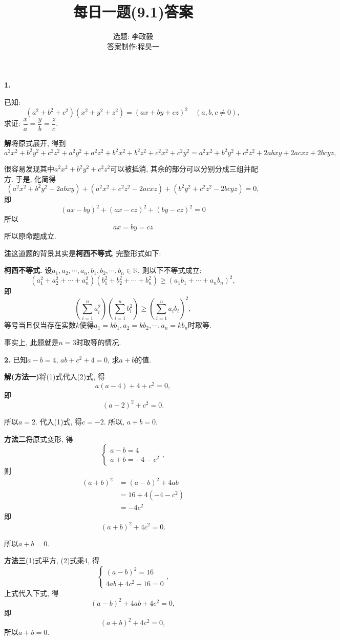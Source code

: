 \documentclass{article}
\title{每日一题(9.1)答案}
\author{\kaishu 选题: 李政毅\\\kaishu 答案制作:程昊一}
\begin{document}
\maketitle
\textbf{1. }
{\kaishu 已知:
\[\left(a^2+b^2+c^2\right)\left(x^2+y^2+z^2\right)=(ax+by+cz)^2\quad(a,b,c\neq0),\]
求证: $\dfrac{x}{a}=\dfrac{y}{b}=\dfrac{z}{c}$.\\\par}

\textbf{解}\quad 将原式展开, 得到
\[a^2x^2+b^2y^2+c^2z^2+a^2y^2+a^2z^2+b^2x^2+b^2z^2+c^2x^2+c^2y^2=a^2x^2+b^2y^2+c^2z^2+2abxy+2acxz+2bcyz,\]\par
很容易发现其中$a^2x^2+b^2y^2+c^2z^2$可以被抵消, 其余的部分可以分别分成三组并配方. 于是, 化简得
\[\left(a^2x^2+b^2y^2-2abxy\right)+\left(a^2x^2+c^2z^2-2acxz\right)+\left(b^2y^2+c^2z^2-2bcyz\right)=0,\]
即
\[(ax-by)^2+(ax-cz)^2+(by-cz)^2=0\]
所以
\[ax=by=cz\]
所以原命题成立.\\\par
\textbf{注}\quad 这道题的背景其实是\textbf{柯西不等式}, 完整形式如下:\par
\textbf{柯西不等式.} 设$a_1, a_2, \cdots, a_n, b_1, b_2, \cdots, b_n\in\mathbb{R}$, 则以下不等式成立: 
\[\left(a_1^2+a_2^2+\cdots+a_n^2\right)\left(b_1^2+b_2^2+\cdots+b_n^2\right)\ge(a_1b_1+\cdots+a_nb_n)^2,\]
即
\[\left(\sum\limits_{i=1}^na_i^2\right)\left(\sum\limits_{i=1}^nb_i^2\right)\ge\left(\sum\limits_{i=1}^na_ib_i\right)^2, \]
等号当且仅当存在实数$k$使得$a_1=kb_1, a_2=kb_2,\cdots, a_n=kb_n$时取等.\par
事实上, 此题就是$n=3$时取等的情况.\\\par
\textbf{2. }
{\kaishu 已知$a-b=4$, $ab+c^2+4=0$, 求$a+b$的值.}\\\par
\textbf{解(方法一)}\quad 将(1)式代入(2)式, 得
\[a(a-4)+4+c^2=0,\]
即
\[(a-2)^2+c^2=0.\]\par
所以$a=2$. 代入(1)式, 得$c=-2$. 所以, $a+b=0$.\par
\textbf{方法二}\quad 将原式变形, 得
\[\begin{cases}
	a-b=4\\a+b=-4-c^2
\end{cases},\]
则
\begin{align*}
	(a+b)^2&=(a-b)^2+4ab\\
	&=16+4(-4-c^2)\\
	&=-4c^2
\end{align*}
即
\[(a+b)^2+4c^2=0.\]\par
所以$a+b=0$.\par
\textbf{方法三}\quad (1)式平方, (2)式乘4, 得
\[\begin{cases}
	(a-b)^2=16\\4ab+4c^2+16=0
\end{cases},\]
上式代入下式, 得
\[(a-b)^2+4ab+4c^2=0,\]
即
\[(a+b)^2+4c^2=0,\]
所以$a+b=0$.
\end{document}
